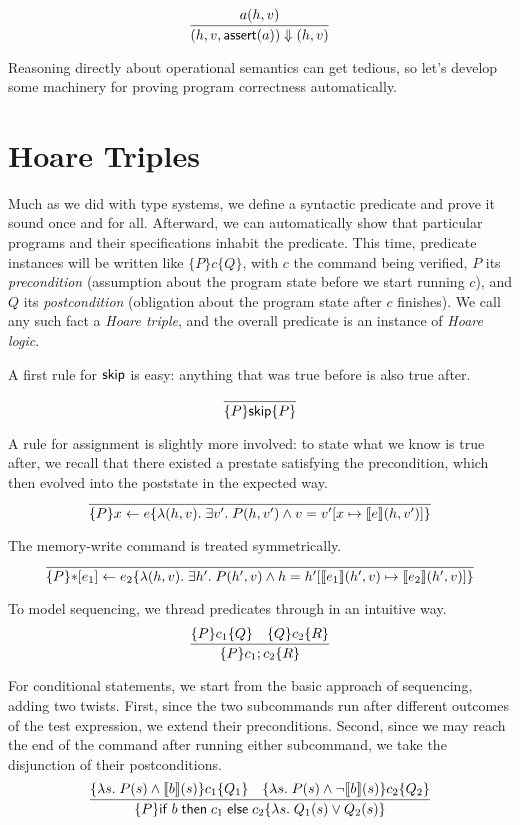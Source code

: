 \documentclass{amsbook}
\theoremstyle{definition}
\theoremstyle{remark}
\numberwithin{section}{chapter}
\numberwithin{equation}{chapter}
\begin{document}
$$\infer{\bigstep{(h, v, \assert{a})}{(h, v)}}{
  a(h, v)
}$$

Reasoning directly about operational semantics can get tedious, so let's develop some machinery for proving program correctness automatically.


\section{Hoare Triples}

\newcommand{\hoare}[3]{\{#1\} #2 \{#3\}}

Much as we did with type systems, we define a syntactic predicate and prove it sound once and for all.
Afterward, we can automatically show that particular programs and their specifications inhabit the predicate.
This time, predicate instances will be written like $\hoare{P}{c}{Q}$, with $c$ the command being verified, $P$ its \emph{precondition} (assumption about the program state before we start running $c$), and $Q$ its \emph{postcondition} (obligation about the program state after $c$ finishes).
We call any such fact a \emph{Hoare triple}, and the overall predicate is an instance of \emph{Hoare logic}.

\encoding
A first rule for $\mathsf{skip}$ is easy: anything that was true before is also true after.

$$\infer{\hoare{P}{\skipe}{P}}{}$$

A rule for assignment is slightly more involved: to state what we know is true after, we recall that there existed a prestate satisfying the precondition, which then evolved into the poststate in the expected way.
$$\infer{\hoare{P}{\assign{x}{e}}{\lambda (h, v). \; \exists v'. \; P(h, v') \land v = \mupd{v'}{x}{\denote{e}(h, v')}}}{}$$

The memory-write command is treated symmetrically.
$$\infer{\hoare{P}{\writeto{e_1}{e_2}}{\lambda (h, v). \; \exists h'. \; P(h', v) \land h = \mupd{h'}{\denote{e_1}(h', v)}{\denote{e_2}(h', v)}}}{}$$

To model sequencing, we thread predicates through in an intuitive way.
$$\infer{\hoare{P}{c_1; c_2}{R}}{
  \hoare{P}{c_1}{Q}
  & \hoare{Q}{c_2}{R}
}$$

For conditional statements, we start from the basic approach of sequencing, adding two twists.
First, since the two subcommands run after different outcomes of the test expression, we extend their preconditions.
Second, since we may reach the end of the command after running either subcommand, we take the disjunction of their postconditions.
$$\infer{\hoare{P}{\ifte{b}{c_1}{c_2}}{\lambda s. \; Q_1(s) \lor Q_2(s)}}{
  \hoare{\lambda s. \; P(s) \land \denote{b}(s)}{c_1}{Q_1}
  & \hoare{\lambda s. \; P(s) \land \neg \denote{b}(s)}{c_2}{Q_2}
}$$
\end{document}
